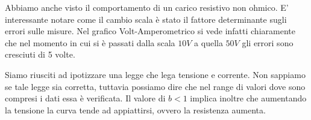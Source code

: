  Abbiamo anche visto il comportamento di un carico resistivo non ohmico. E' interessante notare come il cambio scala è stato il fattore determinante sugli errori sulle misure. Nel grafico Volt-Amperometrico si vede infatti chiaramente che nel momento in cui si è passati dalla scala $10V$ a quella $50V$ gli errori sono cresciuti di 5 volte.
 
Siamo riusciti ad ipotizzare una legge che lega tensione e corrente. Non sappiamo se tale legge sia corretta, tuttavia possiamo dire che nel range di valori dove sono compresi i dati essa è verificata. Il valore di $b<1$ implica inoltre che aumentando la tensione la curva tende ad appiattirsi, ovvero la resistenza aumenta. 
